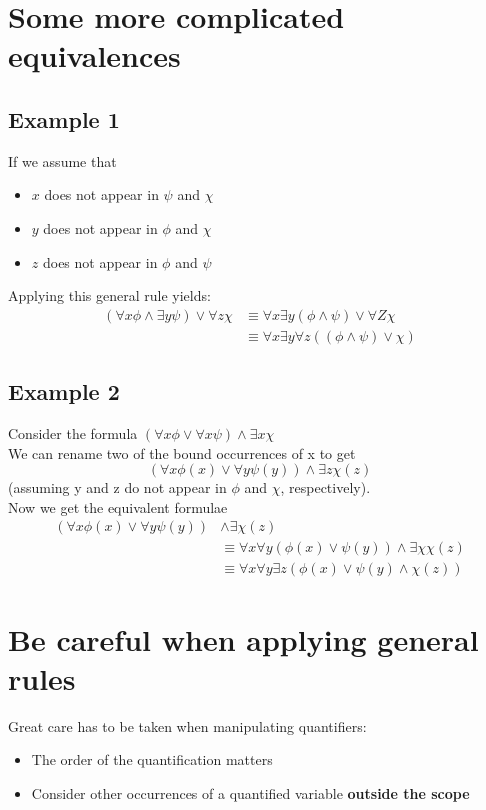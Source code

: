 \documentclass{article}[18pt]
\begin{document}
\section{Some more complicated equivalences}
\subsection{Example 1}
If we assume that
\begin{itemize}
	\item $x$ does not appear in $\psi$ and $\chi$
	\item $y$ does not appear in $\phi$ and $\chi$
	\item $z$ does not appear in $\phi$ and $\psi$
\end{itemize}
Applying this general rule yields:
$$\begin{aligned} ( \forall x \phi \wedge \exists y \psi ) \vee \forall z \chi & \equiv \forall x \exists y ( \phi \wedge \psi ) \vee \forall Z \chi \\ & \equiv \forall x \exists y \forall z ( ( \phi \wedge \psi ) \vee \chi ) \end{aligned}$$
\subsection{Example 2}
Consider the formula $( \forall x \phi \vee \forall x \psi ) \wedge \exists x \chi$\\
We can rename two of the bound occurrences of x to get
$$( \forall x \phi ( x ) \vee \forall y \psi ( y ) ) \wedge \exists z\chi ( z )$$
(assuming y and z do not appear in $\phi$ and $\chi$, respectively).\\
Now we get the equivalent formulae
$$\begin{aligned} ( \forall x \phi ( x ) \vee \forall y \psi ( y ) ) & \wedge \exists \chi ( z ) \\ & \equiv \forall x \forall y ( \phi ( x ) \vee \psi ( y ) ) \wedge \exists \chi \chi ( z ) \\ & \equiv \forall x \forall y \exists z ( \phi ( x ) \vee \psi ( y ) \wedge \chi ( z ) ) \end{aligned}$$
\section{Be careful when applying general rules}
Great care has to be taken when manipulating quantifiers:
\begin{itemize}
	\item The order of the quantification matters
	\item Consider other occurrences of a quantified variable \textbf{outside the scope}
\end{itemize}
\end{document}

